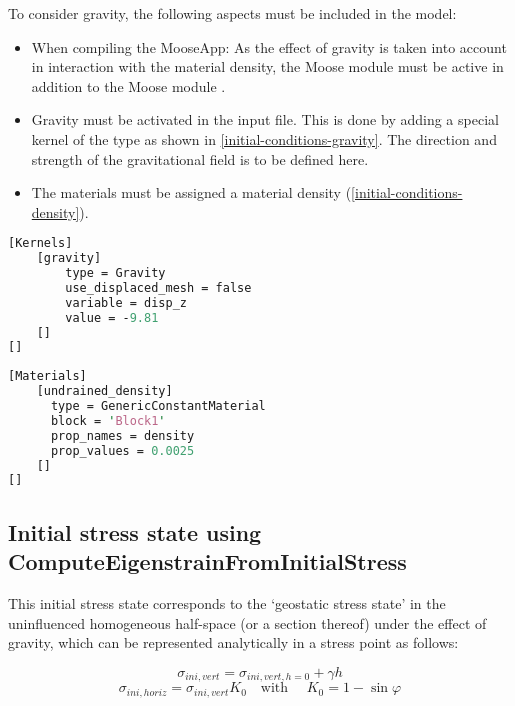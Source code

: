 To consider gravity, the following aspects must be included in the model:
\begin{itemize}
    \item When compiling the MooseApp: As the effect of gravity is taken into account in
          interaction with the material density, the Moose module  must be
          active in addition to the Moose module .
    \item Gravity must be activated in the input file. This is done by adding a special
          kernel of the type  as shown in
          \autoref{initial-conditions-gravity}. The direction and strength of the
          gravitational field is to be defined here.
    \item The materials must be assigned a material density
          (\autoref{initial-conditions-density}).
\end{itemize}

\begin{lstlisting}[language=perl, float, caption={Gravity kernel in a Moose inut file},label={initial-conditions-gravity}]
[Kernels]
    [gravity]
        type = Gravity
        use_displaced_mesh = false
        variable = disp_z
        value = -9.81
    []
[]
\end{lstlisting}

\begin{lstlisting}[language=perl, float, caption={Assignment of a density to subdomain ‘block1’},label={initial-conditions-density}]
[Materials]
    [undrained_density]
      type = GenericConstantMaterial
      block = 'Block1'
      prop_names = density
      prop_values = 0.0025
    []
[]
\end{lstlisting}

{\hfuzz=20pt
\subsection{Initial stress state using ComputeEigenstrainFromInitialStress}
}
\label{chap:IC-stress-state-simple}

This initial stress state corresponds to the ‘geostatic stress state’ in the
uninfluenced homogeneous half-space (or a section thereof) under the effect of
gravity, which can be represented analytically in a stress point as follows:

\begin{equation}
    \sigma_{ini,vert}=\sigma_{ini,vert,h=0}+\gamma h
\end{equation}
\begin{equation}
    \sigma_{ini,horiz}=\sigma_{ini,vert} K_0 \quad \text{with } \quad K_0 = 1-\sin\varphi
\end{equation}

